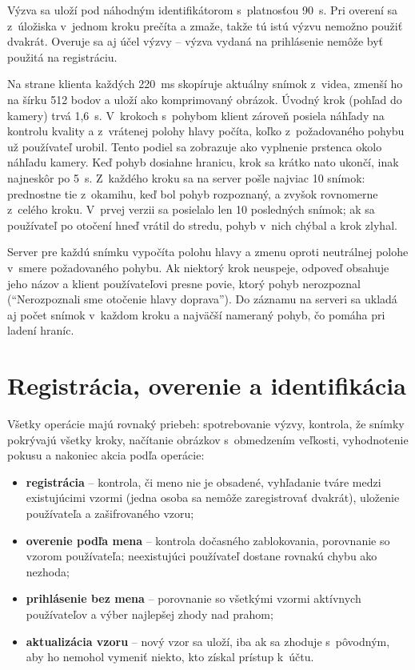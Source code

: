 \documentclass[12pt,a4paper,oneside]{report}
\begin{document}
Výzva sa uloží pod náhodným identifikátorom s~platnosťou 90~s. Pri overení sa
z~úložiska v~jednom kroku prečíta a zmaže, takže tú istú výzvu nemožno použiť dvakrát.
Overuje sa aj účel výzvy -- výzva vydaná na prihlásenie nemôže byť použitá na
registráciu.

Na strane klienta každých 220~ms skopíruje aktuálny snímok z~videa, zmenší ho na šírku
512 bodov a uloží ako komprimovaný obrázok. Úvodný krok (pohľad do kamery) trvá 1,6~s.
V~krokoch s~pohybom klient zároveň posiela náhľady na kontrolu kvality a z~vrátenej
polohy hlavy počíta, koľko z~požadovaného pohybu už používateľ urobil. Tento podiel sa
zobrazuje ako vyplnenie prstenca okolo náhľadu kamery. Keď pohyb dosiahne hranicu, krok
sa krátko nato ukončí, inak najneskôr po 5~s. Z~každého kroku sa na server pošle najviac
10 snímok: prednostne tie z~okamihu, keď bol pohyb rozpoznaný, a zvyšok rovnomerne
z~celého kroku. V~prvej verzii sa posielalo len 10 posledných snímok; ak sa používateľ
po otočení hneď vrátil do stredu, pohyb v~nich chýbal a krok zlyhal.

Server pre každú snímku vypočíta polohu hlavy a zmenu oproti neutrálnej polohe v~smere
požadovaného pohybu. Ak niektorý krok neuspeje, odpoveď obsahuje jeho názov a klient
používateľovi presne povie, ktorý pohyb nerozpoznal (\enquote{Nerozpoznali sme otočenie
hlavy doprava}). Do záznamu na serveri sa ukladá aj počet snímok v~každom kroku
a najväčší nameraný pohyb, čo pomáha pri ladení hraníc.

\section{Registrácia, overenie a identifikácia}

Všetky operácie majú rovnaký priebeh: spotrebovanie výzvy, kontrola, že snímky pokrývajú
všetky kroky, načítanie obrázkov s~obmedzením veľkosti, vyhodnotenie pokusu a nakoniec
akcia podľa operácie:
\begin{itemize}
  \item \textbf{registrácia} -- kontrola, či meno nie je obsadené, vyhľadanie tváre medzi
        existujúcimi vzormi (jedna osoba sa nemôže zaregistrovať dvakrát), uloženie
        používateľa a zašifrovaného vzoru;
  \item \textbf{overenie podľa mena} -- kontrola dočasného zablokovania, porovnanie so
        vzorom používateľa; neexistujúci používateľ dostane rovnakú chybu ako nezhoda;
  \item \textbf{prihlásenie bez mena} -- porovnanie so všetkými vzormi aktívnych
        používateľov a výber najlepšej zhody nad prahom;
  \item \textbf{aktualizácia vzoru} -- nový vzor sa uloží, iba ak sa zhoduje s~pôvodným,
        aby ho nemohol vymeniť niekto, kto získal prístup k~účtu.
\end{itemize}
\end{document}
